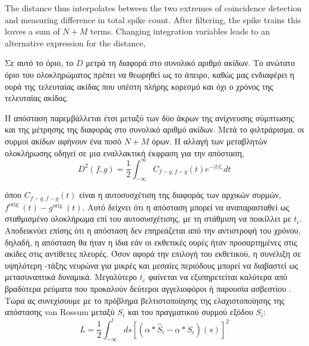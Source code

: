 \documentclass[12pt]{report}
\begin{document}
The distance thus interpolates between the two extremes of coincidence detection and measuring difference in total spike count. After filtering, the spike trains this leaves a sum of $N+M$ terms.
Changing integration variables leads to an alternative expression for the distance,

Σε αυτό το όριο, το $D$ μετρά τη διαφορά στο συνολικό αριθμό ακίδων. Το ανώτατο όριο του ολοκληρώματος πρέπει να θεωρηθεί ως το άπειρο, καθώς μας ενδιαφέρει η ουρά της τελευταίας ακίδας που υπέστη πλήρης κορεσμό και όχι ο χρόνος της τελευταίας ακίδας.

Η απόσταση παρεμβάλλεται έτσι μεταξύ των δύο άκρων της ανίχνευσης σύμπτωσης και της μέτρησης της διαφοράς στο συνολικό αριθμό ακίδων. Μετά το φιλτράρισμα, οι συρμοί ακίδων αφήνουν ένα ποσό $N+M$ όρων.
Η αλλαγή των μεταβλητών ολοκλήρωσης οδηγεί σε μια εναλλακτική έκφραση για την απόσταση,
\begin{equation}
D^{2}(f, g)=\frac{1}{2} \int_{-\infty}^{\infty} C_{f-g, f-g}(t) e^{-|t| t_{c}} d t
\end{equation}

όπου $C_{f-g, f-g}(t)$ είναι η αυτοσυσχέτιση της διαφοράς των αρχικών συρμών, $f^{\text {orig }}(t)-g^{\text {orig }}(t) .$ Αυτό δείχνει ότι η απόσταση μπορεί να αναπαρασταθεί ως σταθμισμένο ολοκλήρωμα επί του αυτοσυσχέτισης, με τη στάθμιση να ποικίλλει με $t_{c}$. Αποδεικνύει επίσης ότι η απόσταση δεν επηρεάζεται από την αντιστροφή του χρόνου, δηλαδή, η απόσταση θα ήταν η ίδια εάν οι εκθετικές ουρές ήταν προσαρτημένες στις ακίδες στις αντίθετες πλευρές. Όσον αφορά την επιλογή του εκθετικού, η συνέλιξη σε υψηλότερη -τάξης νευρώνα για μικρές και μεσαίες περιόδους μπορεί να διαβαστεί ως μετασυναπτικά δυναμικά. Μεγαλύτερο $t_{c}$ φαίνεται να εξυπηρετείται καλύτερα από βραδύτερα ρεύματα που προκαλούν δεύτεροι αγγελιοφόροι ή παρουσία ασβεστίου .
Τώρα ας συνεχίσουμε με το πρόβλημα βελτιστοποίησης της ελαχιστοποίησης της απόστασης \textlatin{van Rossum} \cite {rossum2001} μεταξύ $\hat{S}_{i}$ και του πραγματικού συρμού εξόδου $S_{i}$:
\begin{equation}
L=\frac{1}{2} \int_{-\infty}^{t} d s\left[\left(\alpha * \hat{S}_{i}-\alpha * S_{i}\right)(s)\right]^{2}
\end{equation}
\end{document}

